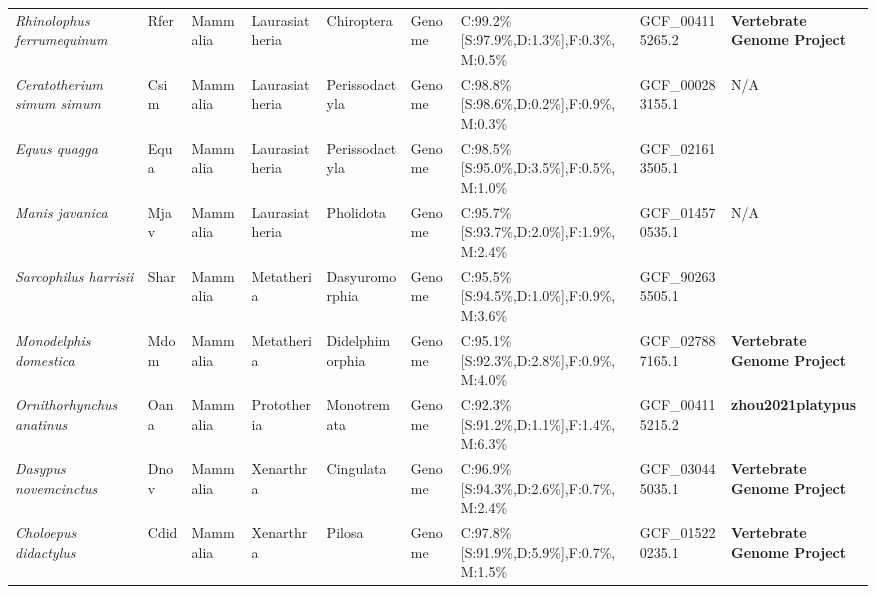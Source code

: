 \documentclass[../main.tex]{subfiles}
\begin{document}
\begin{landscape}
\begin{longtable}{lllllllll}
		\textit{Rhinolophus ferrumequinum}      & Rfer        & Mammalia       & Laurasiatheria   & Chiroptera      & Genome        & C:99.2\%{[}S:97.9\%,D:1.3\%{]},F:0.3\%,M:0.5\% & GCF\_004115265.2       & \textbf{Vertebrate Genome Project}        \\
		\textit{Ceratotherium simum simum}      & Csim        & Mammalia       & Laurasiatheria   & Perissodactyla  & Genome        & C:98.8\%{[}S:98.6\%,D:0.2\%{]},F:0.9\%,M:0.3\% & GCF\_000283155.1       & N/A                                       \\
		\textit{Equus quagga}                   & Equa        & Mammalia       & Laurasiatheria   & Perissodactyla  & Genome        & C:98.5\%{[}S:95.0\%,D:3.5\%{]},F:0.5\%,M:1.0\% & GCF\_021613505.1       & \textbf{\cite{vilstrup2013mitochondrial}} \\
		\textit{Manis javanica}                 & Mjav        & Mammalia       & Laurasiatheria   & Pholidota       & Genome        & C:95.7\%{[}S:93.7\%,D:2.0\%{]},F:1.9\%,M:2.4\% & GCF\_014570535.1       & N/A                                       \\
		\textit{Sarcophilus harrisii}           & Shar        & Mammalia       & Metatheria       & Dasyuromorphia  & Genome        & C:95.5\%{[}S:94.5\%,D:1.0\%{]},F:0.9\%,M:3.6\% & GCF\_902635505.1       & \textbf{\cite{stammnitz2023evolution}}    \\
		\textit{Monodelphis domestica}          & Mdom        & Mammalia       & Metatheria       & Didelphimorphia & Genome        & C:95.1\%{[}S:92.3\%,D:2.8\%{]},F:0.9\%,M:4.0\% & GCF\_027887165.1       & \textbf{Vertebrate Genome Project}        \\
		\textit{Ornithorhynchus anatinus}       & Oana        & Mammalia       & Prototheria      & Monotremata     & Genome        & C:92.3\%{[}S:91.2\%,D:1.1\%{]},F:1.4\%,M:6.3\% & GCF\_004115215.2       & \textbf{zhou2021platypus}                 \\
		\textit{Dasypus novemcinctus}           & Dnov        & Mammalia       & Xenarthra        & Cingulata       & Genome        & C:96.9\%{[}S:94.3\%,D:2.6\%{]},F:0.7\%,M:2.4\% & GCF\_030445035.1       & \textbf{Vertebrate Genome Project}        \\
		\textit{Choloepus didactylus}           & Cdid        & Mammalia       & Xenarthra        & Pilosa          & Genome        & C:97.8\%{[}S:91.9\%,D:5.9\%{]},F:0.7\%,M:1.5\% & GCF\_015220235.1       & \textbf{Vertebrate Genome Project}        \\* \bottomrule \bottomrule
	\end{longtable}
\end{landscape}

\clearpage
\end{document}

